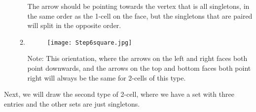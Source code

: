 \documentclass{amsart}
\begin{document}
\begin{exmp}
\begin{enumerate}
\begin{enumerate}
The arrow should be pointing towards the vertex that is all singletons, in the same order as the 1-cell on the face, but the singletons that are paired will split in the opposite order.
\item
\begin{figure}[h] 
\texttt{[image: Step6square.jpg]}
\centering
\end{figure}
Note: This orientation, where the arrows on the left and right faces both point downwards, and the arrows on the top and bottom faces both point right will always be the same for 2-cells of this type.
\end{enumerate}
\end{enumerate}
\end{exmp}

Next, we will draw the second type of 2-cell, where we have a set with three entries and the other sets are just singletons.
\end{document}
